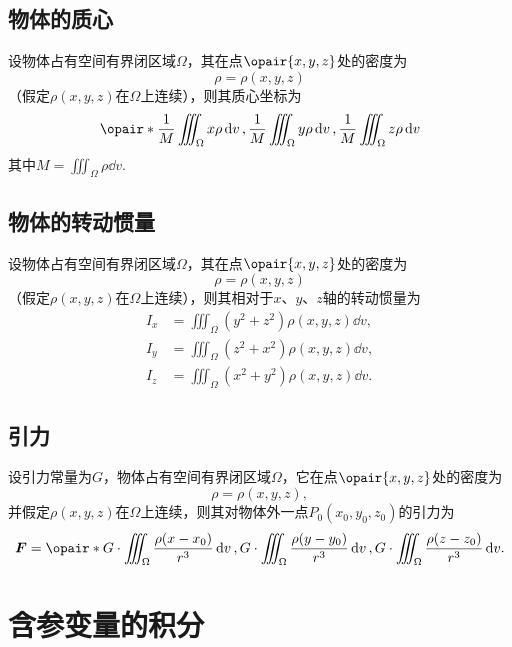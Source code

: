 \subsection{物体的质心}
\begin{theorem}
设物体占有空间有界闭区域\(\Omega\)，其在点\(\opair{x,y,z}\)处的密度为\[
\rho=\rho(x,y,z)
\]（假定\(\rho(x,y,z)\)在\(\Omega\)上连续），则其质心坐标为\begin{equation}
\opair*{
\frac{1}{M} \iiint_{\Omega} x \rho \dd{v},
\frac{1}{M} \iiint_{\Omega} y \rho \dd{v},
\frac{1}{M} \iiint_{\Omega} z \rho \dd{v}
}
\end{equation}其中\(M = \iiint_{\Omega} \rho \dd{v}\).
\end{theorem}

\subsection{物体的转动惯量}
\begin{theorem}
设物体占有空间有界闭区域\(\Omega\)，其在点\(\opair{x,y,z}\)处的密度为\[
\rho=\rho(x,y,z)
\]（假定\(\rho(x,y,z)\)在\(\Omega\)上连续），则其相对于\(x\)、\(y\)、\(z\)轴的转动惯量为\begin{align}
I_x &= \iiint_{\Omega} (y^2+z^2) \rho(x,y,z) \dd{v}, \\
I_y &= \iiint_{\Omega} (z^2+x^2) \rho(x,y,z) \dd{v}, \\
I_z &= \iiint_{\Omega} (x^2+y^2) \rho(x,y,z) \dd{v}.
\end{align}
\end{theorem}

\subsection{引力}
\begin{theorem}
设引力常量为\(G\)，物体占有空间有界闭区域\(\Omega\)，它在点\(\opair{x,y,z}\)处的密度为\[
\rho=\rho(x,y,z),
\]并假定\(\rho(x,y,z)\)在\(\Omega\)上连续，则其对物体外一点\(P_0(x_0,y_0,z_0)\)的引力为\begin{equation}
\mat{F}
= \opair*{
G \cdot \iiint_{\Omega} \frac{\rho (x-x_0)}{r^3} \dd{v},
G \cdot \iiint_{\Omega} \frac{\rho (y-y_0)}{r^3} \dd{v},
G \cdot \iiint_{\Omega} \frac{\rho (z-z_0)}{r^3} \dd{v}
}.
\end{equation}
\end{theorem}

\section{含参变量的积分}
